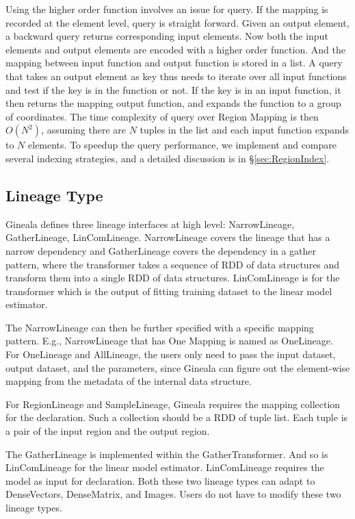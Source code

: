 \documentclass{sig-alternate}
\begin{document}
Using the higher order function involves an issue for query. If the mapping is recorded at the element level, query is straight forward.
Given an output element, a backward query returns corresponding input elements.
Now both the input elements and output elements are encoded with a higher order function. 
And the mapping between input function and output function is stored in a list. 
A query that takes an output element as key thus needs to iterate over all input functions and test if the key is in the function or not.
If the key is in an input function, it then returns the mapping output function, and expands the function to a group of coordinates.
The time complexity of query over Region Mapping is then $O(N^2)$, assuming there are $N$ tuples in the list and each input function expands to $N$ elements.
To speedup the query performance, we implement and compare several indexing strategies, and a detailed discussion is in \S\ref{sec:RegionIndex}.

\subsection{Lineage Type}
Gineala defines three lineage interfaces at high level: NarrowLineage, GatherLineage, LinComLineage. 
NarrowLineage covers the lineage that has a narrow dependency and GatherLineage covers the dependency in a gather pattern, where the transformer takes a sequence of RDD of data structures and transform them into a single RDD of data structures. 
LinComLineage is for the transformer which is the output of fitting training dataset to the linear model estimator.

The NarrowLineage can then be further specified with a specific mapping pattern. E.g., NarrowLineage that has One Mapping is named as OneLineage.
For OneLineage and AllLineage, the users only need to pass the input dataset, output dataset, and the parameters, since Gineala can figure out the element-wise mapping from the metadata of the internal data structure.

For RegionLineage and SampleLineage, Gineala requires the mapping collection for the declaration. 
Such a collection should be a RDD of tuple list. 
Each tuple is a pair of the input region and the output region.

The GatherLineage is implemented within the GatherTransformer.
And so is LinComLineage for the linear model estimator. LinComLineage requires the model as input for declaration.
Both these two lineage types can adapt to DenseVectors, DenseMatrix, and Images. 
Users do not have to modify these two lineage types. 
\end{document}

